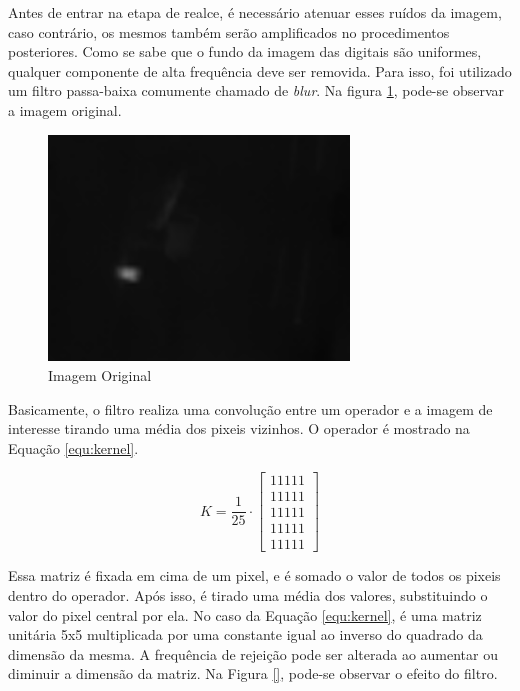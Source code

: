 		Antes de entrar na etapa de realce, é necessário atenuar esses ruídos da imagem, caso contrário, os mesmos também serão amplificados no procedimentos posteriores. Como se sabe que o fundo da imagem das digitais são uniformes, qualquer componente de alta frequência deve ser removida. Para isso, foi utilizado um filtro passa-baixa comumente chamado de \textit{blur}. Na figura \ref{fig:img_80graus}, pode-se observar a imagem original.
			
		\begin{figure}[!ht]
		   \centering
		   \includegraphics[width=8cm]{Figures/flirphoto.png}
		   \caption{Imagem Original}
		   \label{fig:img_80graus}
		\end{figure}
		
		Basicamente, o filtro realiza uma convolução entre um operador e a imagem de interesse tirando uma média dos pixeis vizinhos. O operador é mostrado na Equação \ref{equ:kernel}.
		
		\begin{equation}
			K = \frac{1}{25}\cdot \begin{bmatrix}
			 1  1  1  1  1\\ 
			 1  1  1  1  1\\ 
			 1  1  1  1  1\\ 
			 1  1  1  1  1\\ 
			 1  1  1  1  1 
			\end{bmatrix}
			\label{equ:kernel}
		\end{equation}
		
		Essa matriz é fixada em cima de um pixel, e é somado o valor de todos os pixeis dentro do operador. Após isso, é tirado uma média dos valores, substituindo o valor do pixel central por ela. No caso da Equação \ref{equ:kernel}, é uma matriz unitária 5x5 multiplicada por uma constante igual ao inverso do quadrado da dimensão da mesma. A frequência de rejeição pode ser alterada ao aumentar ou diminuir a dimensão da matriz. Na Figura \ref{}, pode-se observar o efeito do filtro.
		
